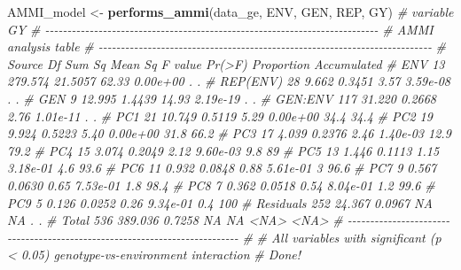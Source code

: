 \documentclass[
]{book}
\newenvironment{Shaded}{\begin{snugshade}}{\end{snugshade}}
\newcommand{\CommentTok}[1]{\textcolor[rgb]{0.56,0.35,0.01}{\textit{#1}}}
\newcommand{\KeywordTok}[1]{\textcolor[rgb]{0.13,0.29,0.53}{\textbf{#1}}}
\newcommand{\NormalTok}[1]{#1}
\newcommand{\StringTok}[1]{\textcolor[rgb]{0.31,0.60,0.02}{#1}}
\numberwithin{equation}{section}
\begin{document}
\begin{Shaded}
\begin{Highlighting}[]

\NormalTok{AMMI\_model \textless{}{-}}\StringTok{ }\KeywordTok{performs\_ammi}\NormalTok{(data\_ge, ENV, GEN, REP, GY)}
\CommentTok{\# variable GY }
\CommentTok{\# {-}{-}{-}{-}{-}{-}{-}{-}{-}{-}{-}{-}{-}{-}{-}{-}{-}{-}{-}{-}{-}{-}{-}{-}{-}{-}{-}{-}{-}{-}{-}{-}{-}{-}{-}{-}{-}{-}{-}{-}{-}{-}{-}{-}{-}{-}{-}{-}{-}{-}{-}{-}{-}{-}{-}{-}{-}{-}{-}{-}{-}{-}{-}{-}{-}{-}{-}{-}{-}{-}{-}{-}{-}{-}{-}}
\CommentTok{\# AMMI analysis table}
\CommentTok{\# {-}{-}{-}{-}{-}{-}{-}{-}{-}{-}{-}{-}{-}{-}{-}{-}{-}{-}{-}{-}{-}{-}{-}{-}{-}{-}{-}{-}{-}{-}{-}{-}{-}{-}{-}{-}{-}{-}{-}{-}{-}{-}{-}{-}{-}{-}{-}{-}{-}{-}{-}{-}{-}{-}{-}{-}{-}{-}{-}{-}{-}{-}{-}{-}{-}{-}{-}{-}{-}{-}{-}{-}{-}{-}{-}}
\CommentTok{\#     Source  Df  Sum Sq Mean Sq F value   Pr(\textgreater{}F) Proportion Accumulated}
\CommentTok{\#        ENV  13 279.574 21.5057   62.33 0.00e+00          .           .}
\CommentTok{\#   REP(ENV)  28   9.662  0.3451    3.57 3.59e{-}08          .           .}
\CommentTok{\#        GEN   9  12.995  1.4439   14.93 2.19e{-}19          .           .}
\CommentTok{\#    GEN:ENV 117  31.220  0.2668    2.76 1.01e{-}11          .           .}
\CommentTok{\#        PC1  21  10.749  0.5119    5.29 0.00e+00       34.4        34.4}
\CommentTok{\#        PC2  19   9.924  0.5223    5.40 0.00e+00       31.8        66.2}
\CommentTok{\#        PC3  17   4.039  0.2376    2.46 1.40e{-}03       12.9        79.2}
\CommentTok{\#        PC4  15   3.074  0.2049    2.12 9.60e{-}03        9.8          89}
\CommentTok{\#        PC5  13   1.446  0.1113    1.15 3.18e{-}01        4.6        93.6}
\CommentTok{\#        PC6  11   0.932  0.0848    0.88 5.61e{-}01          3        96.6}
\CommentTok{\#        PC7   9   0.567  0.0630    0.65 7.53e{-}01        1.8        98.4}
\CommentTok{\#        PC8   7   0.362  0.0518    0.54 8.04e{-}01        1.2        99.6}
\CommentTok{\#        PC9   5   0.126  0.0252    0.26 9.34e{-}01        0.4         100}
\CommentTok{\#  Residuals 252  24.367  0.0967      NA       NA          .           .}
\CommentTok{\#      Total 536 389.036  0.7258      NA       NA       \textless{}NA\textgreater{}        \textless{}NA\textgreater{}}
\CommentTok{\# {-}{-}{-}{-}{-}{-}{-}{-}{-}{-}{-}{-}{-}{-}{-}{-}{-}{-}{-}{-}{-}{-}{-}{-}{-}{-}{-}{-}{-}{-}{-}{-}{-}{-}{-}{-}{-}{-}{-}{-}{-}{-}{-}{-}{-}{-}{-}{-}{-}{-}{-}{-}{-}{-}{-}{-}{-}{-}{-}{-}{-}{-}{-}{-}{-}{-}{-}{-}{-}{-}{-}{-}{-}{-}{-}}
\CommentTok{\# }
\CommentTok{\# All variables with significant (p \textless{} 0.05) genotype{-}vs{-}environment interaction}
\CommentTok{\# Done!}
\end{Highlighting}
\end{Shaded}
\end{document}
